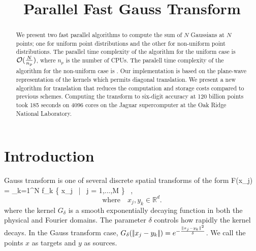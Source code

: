 \documentclass[conference]{IEEEtran}
\begin{document}
\title{Parallel Fast Gauss Transform}  


\author{

\and
{}

\and
{}
}
\date{}
\maketitle

\begin{abstract}
We present two fast parallel algorithms to compute the sum of $N$ Gaussians at $N$ points; 
one for uniform point distributions and the other for non-uniform point distributions. The 
parallel time complexity of the algorithm for the uniform case is $\mathcal{O}(\frac{N}{n_p})$, 
where $n_p$ is the number of CPUs. The paralell time complexity of the algorithm for the
non-uniform case is $ $. 
Our implementation is based on the
plane-wave representation of the kernels which permits diagonal translation. We present a 
new algorithm for translation that reduces the computation and storage costs compared to 
previous schemes. Computing the transform to six-digit accuracy at 120 billion points 
took 185 seconds on 4096 cores on the Jaguar supercomputer at the Oak Ridge National Laboratory. 
\end{abstract}

\section{Introduction}  \label{s:intro}
Gauss transform is one of several discrete spatial transforms of the form 
%
\beq F(x_j) = \sum_{k=1}^N  f_k \quad {} \quad \{ x_j \, | \, j = 1,...,M \} \, , \label{gt} \eeq
\[\text{where} \quad x_j, y_k \in \mathbb{R}^d. \]
%
where the kernel $G_\delta$ is a smooth exponentially decaying function in both the physical
and Fourier domains. The parameter $\delta$ controls how rapidly the kernel decays.  
In the Gauss transform case, $G_\delta (|\!| x_j - y_k |\!|) = e^{-\frac{\|x_j - y_k\|^2}{\delta}}$.  We call the
points $x$ as targets and $y$ as sources.  
\end{document}
